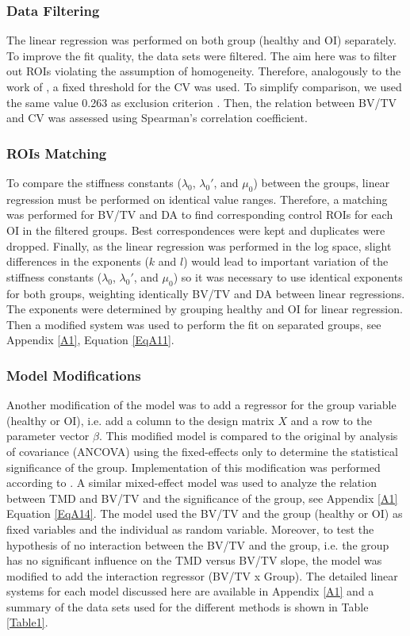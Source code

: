 \documentclass[a4paper,fleqn]{DC_ArtStyle}
\begin{document}
	\subsubsection{Data Filtering}
	The linear regression was performed on both group (heal\-thy and OI) separately. To improve the fit quality, the data sets were filtered. The aim here was to filter out ROIs violating the assumption of homogeneity. Therefore, analogously to the work of \citeauthor{Panyasantisuk2015}\cite{Panyasantisuk2015}, a fixed threshold for the CV was used. To simplify comparison, we used the same value 0.263 as exclusion criterion \cite{Panyasantisuk2015}. Then, the relation between BV/TV and CV was assessed using Spearman's correlation coefficient. 
	
	\subsubsection{ROIs Matching}
	To compare the stiffness constants ($\lambda_0$, $\lambda_0'$, and $\mu_0$) between the groups, linear regression must be performed on identical value ranges. Therefore, a matching was performed for BV/TV and DA to find corresponding control ROIs for each OI in the filtered groups. Best correspondences were kept and duplicates were dropped. Finally, as the linear regression was performed in the log space, slight differences in the exponents ($k$ and $l$) would lead to important variation of the stiffness constants ($\lambda_0$, $\lambda_0'$, and $\mu_0$) so it was necessary to use identical exponents  for both groups, weighting identically BV/TV and DA between linear regressions. The exponents were determined by grouping healthy and OI for linear regression. Then a modified system was used to perform the fit on separated groups, see Appendix \ref{A1}, Equation \ref{EqA11}.\\
	
	\subsubsection{Model Modifications}
	Another modification of the model was to add a regressor for the group variable (healthy or OI), i.e. add a column to the design matrix $X$ and a row to the parameter vector $\beta$. This modified model is compared to the original by analysis of covariance (ANCOVA) using the fixed-effects only to determine the statistical significance of the group. Implementation of this modification was performed according to \cite{Fox2016}. A similar mixed-effect model was used to analyze the relation between TMD and BV/TV and the significance of the group, see Appendix \ref{A1} Equation \ref{EqA14}. The model used the BV/TV and the group (healthy or OI) as fixed variables and the individual as random variable. Moreover, to test the hypothesis of no interaction between the BV/TV and the group, i.e. the group has no significant influence on the TMD versus BV/TV slope, the model was modified to add the interaction regressor (BV/TV x Group). The detailed linear systems for each model discussed here are available in Appendix \ref{A1} and a summary of the data sets used for the different methods is shown in Table \ref{Table1}.\\
	
\end{document}
